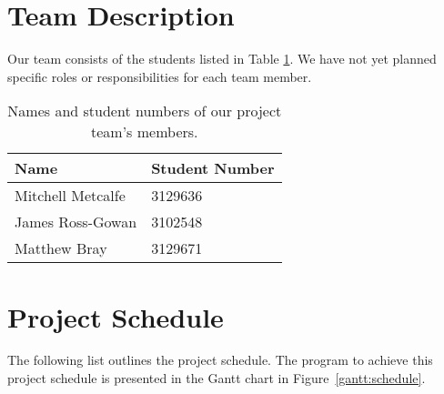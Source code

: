 \documentclass[11pt]{scrartcl} %
\begin{document}
\section*{Team Description}
    Our team consists of the students listed in Table \ref{table:teamMembers}.
    We have not yet planned specific roles or responsibilities for each team
    member.

    \begin{table}[h]
    \centering
        \begin{tabular}{@{}ll@{}}
        \toprule
            Name              & Student Number \\
        \midrule
            Mitchell Metcalfe & 3129636        \\
            James Ross-Gowan  & 3102548        \\
            Matthew Bray      & 3129671        \\
        \bottomrule
        \end{tabular}
        \caption[Team members]{Names and student numbers of our project team's members.}
        \label{table:teamMembers}
    \end{table}

\section*{Project Schedule}

The following list outlines the project schedule. The program to achieve this
project schedule is presented in the Gantt chart in
Figure~\ref{gantt:schedule}.
\end{document}
